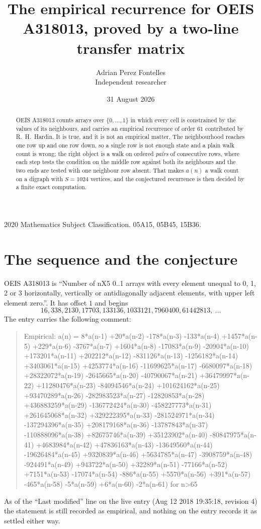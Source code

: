 \documentclass[11pt,a4paper]{article}
\title{The empirical recurrence for OEIS A318013, proved by a two-line transfer matrix}
\author{Adrian Perez Fontelles\\ \small Independent researcher}
\date{31 August 2026}
\theoremstyle{plain}
\theoremstyle{definition}
\begin{document}
\maketitle

\begin{abstract}
OEIS A318013 counts arrays over $\{0,\dots,1\}$ in which every cell is constrained by the
values of its neighbours, and carries an empirical recurrence of order $61$ contributed
by R.~H.~Hardin. It is true, and it is not an empirical matter. The neighbourhood reaches one
row up and one row down, so a single row is not enough state and a plain walk count
is wrong; the right object is a walk on ordered \emph{pairs} of consecutive rows, where
each step tests the condition on the middle row against both its neighbours and the two
ends are tested with one neighbour row absent. That makes $a(n)$ a walk count on a digraph
with $S=1024$ vertices, and the conjectured recurrence is then decided by a finite exact
computation.
\end{abstract}

\noindent\small 2020 Mathematics Subject Classification. 05A15, 05B45, 15B36.\normalsize

\section{The sequence and the conjecture}

OEIS A318013 is ``Number of nX5 0..1 arrays with every element unequal to 0, 1, 2 or 3 horizontally, vertically or antidiagonally adjacent elements, with upper left element zero.''. It has offset $1$ and begins
\[
16, 338, 2130, 17703, 133136, 1033121, 7960400, 61442813,\ \dots
\]
The entry carries the following comment:
\begin{quote}\small
Empirical: a(n) = 8*a(n-1) +20*a(n-2) -178*a(n-3) -133*a(n-4) +1457*a(n-5) +229*a(n-6) -3767*a(n-7) +1604*a(n-8) -17083*a(n-9) -20904*a(n-10) +173201*a(n-11) +202212*a(n-12) -831126*a(n-13) -1256182*a(n-14) +3403061*a(n-15) +4253774*a(n-16) -11699625*a(n-17) -6680097*a(n-18) +28322072*a(n-19) -2645665*a(n-20) -40790067*a(n-21) +36479997*a(n-22) +11280476*a(n-23) -84094546*a(n-24) +101624162*a(n-25) +93470289*a(n-26) -282983523*a(n-27) -12820853*a(n-28) +436883259*a(n-29) -136772424*a(n-30) -458227773*a(n-31) +261645068*a(n-32) +329222395*a(n-33) -281524971*a(n-34) -137294396*a(n-35) +208179168*a(n-36) -13787843*a(n-37) -110888096*a(n-38) +82675746*a(n-39) +35123902*a(n-40) -80847975*a(n-41) +4683984*a(n-42) +47836163*a(n-43) -13649560*a(n-44) -19626484*a(n-45) +9320839*a(n-46) +5634785*a(n-47) -3908759*a(n-48) -924491*a(n-49) +943722*a(n-50) +32289*a(n-51) -77166*a(n-52) +7151*a(n-53) -17074*a(n-54) -886*a(n-55) +5570*a(n-56) +391*a(n-57) -465*a(n-58) -5*a(n-59) +6*a(n-60) -2*a(n-61) for n>65
\end{quote}
As of the ``Last modified'' line on the live entry (Aug 12 2018 19:35:18, revision 4) the statement is
still recorded as empirical, and nothing on the entry records it as settled either way.
\end{document}
